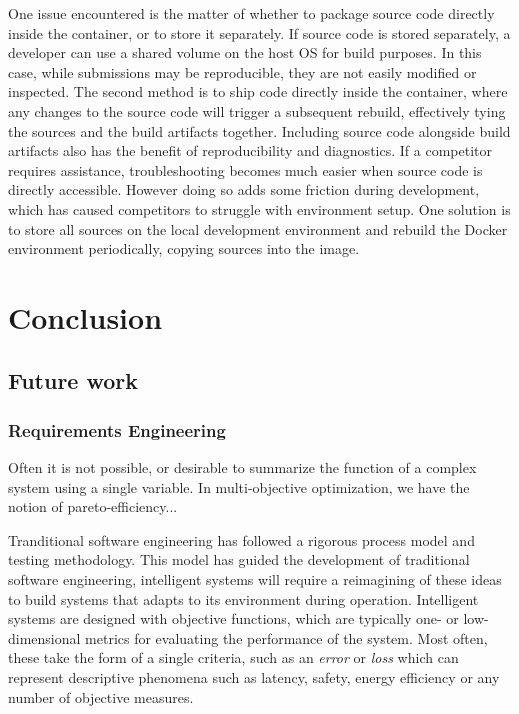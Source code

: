 \documentclass[12pt,initial,twoside,maitrise]{dms}
\numberwithin{equation}{section}
\numberwithin{table}{chapter}
\numberwithin{figure}{chapter}
\begin{document}
One issue encountered is the matter of whether to package source code directly inside the container, or to store it separately. If source code is stored separately, a developer can use a shared volume on the host OS for build purposes. In this case, while submissions may be reproducible, they are not easily modified or inspected. The second method is to ship code directly inside the container, where any changes to the source code will trigger a subsequent rebuild, effectively tying the sources and the build artifacts together. Including source code alongside build artifacts also has the benefit of reproducibility and diagnostics. If a competitor requires assistance, troubleshooting becomes much easier when source code is directly accessible. However doing so adds some friction during development, which has caused competitors to struggle with environment setup. One solution is to store all sources on the local development environment and rebuild the Docker environment periodically, copying sources into the image.

\chapter{Conclusion}

\section{Future work}

\subsection{Requirements Engineering}

Often it is not possible, or desirable to summarize the function of a complex system using a single variable. In multi-objective optimization, we have the notion of pareto-efficiency...

Tranditional software engineering has followed a rigorous process model and testing methodology. This model has guided the development of traditional software engineering, intelligent systems will require a reimagining of these ideas to build systems that adapts to its environment during operation. Intelligent systems are designed with objective functions, which are typically one- or low-dimensional metrics for evaluating the performance of the system. Most often, these take the form of a single criteria, such as an \textit{error} or \textit{loss} which can represent descriptive phenomena such as latency, safety, energy efficiency or any number of objective measures.
\end{document}
